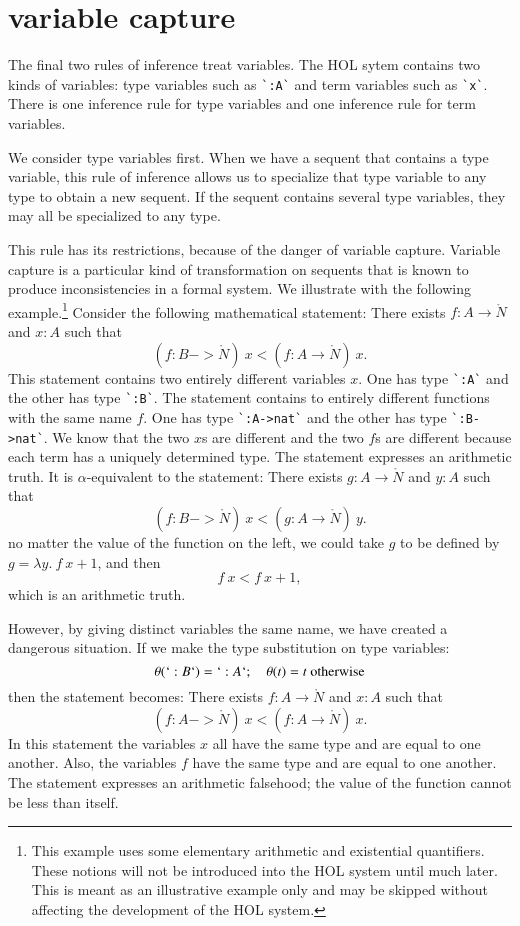 \documentclass[cup9a]{cupbook}
\begin{document}
\section{variable capture}

The final two rules of inference treat variables.  The HOL sytem contains two kinds of variables: type variables such as \verb!`:A`! and term variables such as \verb!`x`!.  There is one inference rule for type variables and one inference rule for term variables.  


We consider type variables first.
When we have a sequent that contains a type variable, this rule of inference allows us to specialize that type variable to any type to obtain a new sequent.  If the sequent contains several type variables, they may all be specialized to any type.

This rule has its restrictions, because of the danger of variable capture.  Variable capture is a particular kind of transformation on sequents that is known to produce inconsistencies in a formal system.  We illustrate with the following example.\footnote{This example uses some elementary arithmetic and existential quantifiers.  These notions will not be introduced into the HOL system until much later.  This is meant as an illustrative example only and may be skipped without affecting the development of the HOL system.}  Consider the following mathematical statement: There exists $f:A\to\ring{N}$ and $x:A$ such that
$$
(f:B->\ring{N})~x < (f:A\to\ring{N})~x.
$$
This statement contains two entirely different variables $x$.  One has type \verb!`:A`! and the other has type \verb!`:B`!.  The statement contains to entirely different functions with the same name $f$.  One has type \verb!`:A->nat`! and the other has type \verb!`:B->nat`!.  We know that the two $x$s are different and the two $f$s are different because each term has a uniquely determined type.  The statement expresses an arithmetic truth.  It is $\alpha$-equivalent to the statement: 
There exists $g:A\to\ring{N}$ and $y:A$ such that
$$
(f:B->\ring{N})~x < (g:A\to\ring{N})~y.
$$
no matter the value of the function on the left, we could take $g$ to be defined by $g = \lambda y.~f~x + 1$, and then
$$
f~x < f~x + 1,
$$
which is an arithmetic truth.

However, by giving distinct variables the same name, we have created a dangerous situation.  If we make the type substitution on type variables:
$$
\theta(`:B`) = `:A`;\quad \theta(t)=t\hbox{ otherwise}
$$
then the statement becomes:
There exists $f:A\to\ring{N}$ and $x:A$ such that
$$
(f:A->\ring{N})~x < (f:A\to\ring{N})~x.
$$
In this statement the variables $x$ all have the same type and are equal to one another.  Also, the variables $f$ have the same type and are equal to one another.  The statement expresses an arithmetic falsehood; the value of the function cannot be less than itself.
\end{document}
